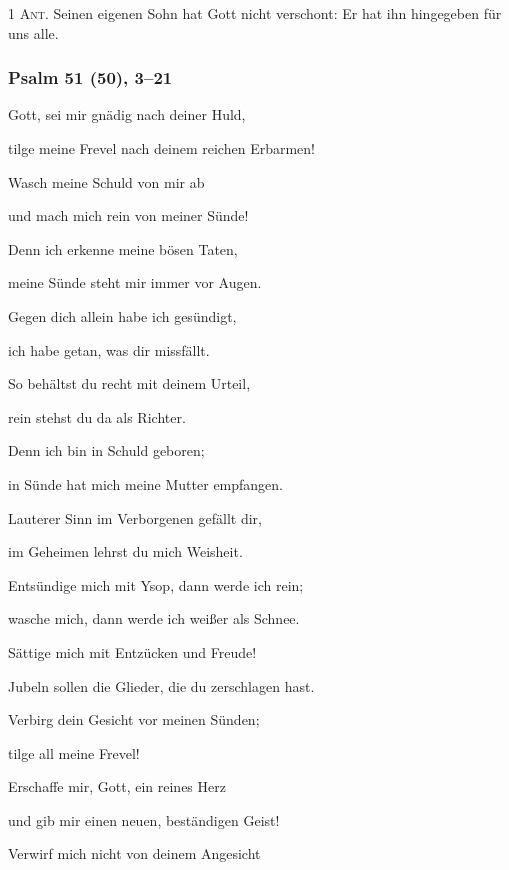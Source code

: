 \noindent \textsc{1 Ant.} Seinen eigenen Sohn hat Gott nicht verschont: Er hat ihn hingegeben für uns alle.

\subsubsection{Psalm 51 (50), 3--21}

\noindent Gott, sei mir gnädig nach deiner Huld,~\GreStar{}~\nopagebreak

tilge meine Frevel nach deinem reichen Erbarmen!

\noindent Wasch meine Schuld von mir ab~\GreStar{}~\nopagebreak

und mach mich rein von meiner Sünde!

\noindent Denn ich erkenne meine bösen Taten,~\GreStar{}~\nopagebreak

meine Sünde steht mir immer vor Augen.

\noindent Gegen dich allein habe ich gesündigt,~\GreStar{}~\nopagebreak

ich habe getan, was dir missfällt. 

\noindent So behältst du recht mit deinem Urteil,~\GreStar{}~\nopagebreak

rein stehst du da als Richter.

\noindent Denn ich bin in Schuld geboren;~\GreStar{}~\nopagebreak

in Sünde hat mich meine Mutter empfangen.

\noindent Lauterer Sinn im Verborgenen gefällt dir,~\GreStar{}~\nopagebreak

im Geheimen lehrst du mich Weisheit.

\noindent Entsündige mich mit Ysop, dann werde ich rein;~\GreStar{}~\nopagebreak

wasche mich, dann werde ich weißer als Schnee.

\noindent Sättige mich mit Entzücken und Freude!~\GreStar{}~\nopagebreak

Jubeln sollen die Glieder, die du zerschlagen hast.

\noindent Verbirg dein Gesicht vor meinen Sünden;~\GreStar{}~\nopagebreak

tilge all meine Frevel!

\noindent Erschaffe mir, Gott, ein reines Herz~\GreStar{}~\nopagebreak

und gib mir einen neuen, beständigen Geist!

\noindent Verwirf mich nicht von deinem Angesicht~\GreStar{}~\nopagebreak

